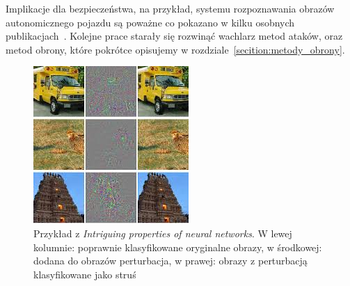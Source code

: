 \documentclass[
    left=2.5cm,         %
    right=2.5cm,        %
    top=2.5cm,          %
    bottom=3cm,         %
    bindingoffset=6mm,  %
    nohyphenation=false %
]{eiti/eiti-thesis}
\begin{document}
Implikacje dla bezpieczeństwa, na przykład, systemu rozpoznawania obrazów autonomicznego pojazdu są poważne co
pokazano w kilku osobnych publikacjach~\cite{DBLP:journals/corr/EvtimovEFKLPRS17,DBLP:journals/corr/abs-1907-00374, DBLP:journals/corr/abs-1801-02780}.
Kolejne prace starały się rozwinąć wachlarz metod ataków, oraz metod obrony\cite{DBLP:journals/corr/PapernotMWJS15, DBLP:journals/corr/abs-1801-08926, DBLP:journals/corr/abs-1904-00887}, które pokrótce opisujemy w rozdziale~\ref{secition:metody_obrony}.
\begin{figure}[h]
    \begin{center}
        \includegraphics[width=0.75\linewidth]{eiti/adversarial_intriguing.jpg}
    \end{center}
    \caption{Przykład z \textit{Intriguing properties of neural networks}\cite{DBLP:journals/corr/SzegedyZSBEGF13}.
        W lewej kolumnie: poprawnie klasyfikowane oryginalne obrazy, w środkowej: dodana do obrazów perturbacja, w prawej: obrazy z perturbacją klasyfikowane jako struś}
    \label{intrguing_plot}
\end{figure}
\end{document}
